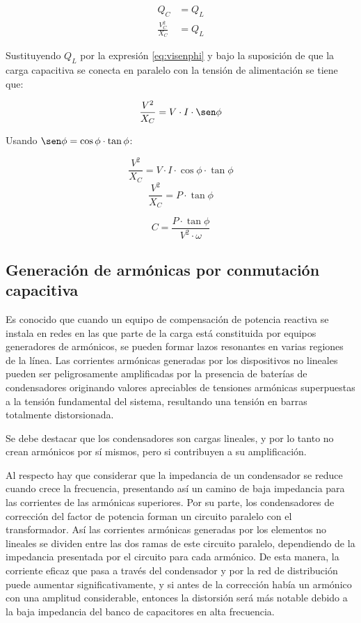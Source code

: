 \begin{align*}
	Q_C &= Q_L \\
	\frac{V_C^2}{X_C} &= Q_L
\end{align*}

Sustituyendo $Q_L$ por la expresión \ref{eq:visenphi} y bajo
la suposición de que la carga capacitiva se conecta en paralelo con la tensión de alimentación se tiene que:

\begin{equation*}
	 \frac{V^2}{X_C} = V\cdot I \cdot \sen\phi
\end{equation*}

Usando $\sen\phi = \cos\phi\cdot\tan\phi$:

\begin{equation*}
    	\frac{V^2}{X_C} = V\cdot I \cdot \cos\phi\cdot\tan\phi
\end{equation*}
\begin{equation*}
     \frac{V^2}{X_C} = P \cdot\tan\phi
\end{equation*}

\begin{equation}
    C = \frac{P \cdot\tan\phi}{V^2\cdot \omega} 
\end{equation}


\subsection{Generación de armónicas por conmutación capacitiva}

Es conocido que cuando un equipo de compensación de potencia reactiva se instala en redes en las que parte de la carga está constituida por equipos generadores de armónicos, se pueden formar lazos resonantes en varias regiones de la línea. Las corrientes armónicas generadas por los dispositivos no lineales pueden ser peligrosamente amplificadas por la presencia de baterías de condensadores originando valores apreciables de tensiones armónicas superpuestas a la tensión fundamental del sistema, resultando una tensión en barras totalmente distorsionada.

Se debe destacar que los condensadores son cargas lineales, y por lo tanto no crean armónicos por sí mismos, pero si contribuyen a su amplificación.

Al respecto hay que considerar que la impedancia de un condensador se reduce cuando crece la frecuencia, presentando así un camino de baja impedancia para las corrientes de las armónicas superiores. Por su parte, los condensadores de corrección del factor de potencia forman un circuito paralelo con el transformador. Así las corrientes armónicas generadas por los elementos no lineales se dividen entre las dos ramas de este circuito paralelo, dependiendo de la impedancia presentada por el circuito para cada armónico. De esta manera, la corriente eficaz que pasa a través del condensador y por la red de distribución puede aumentar significativamente, y si antes de la corrección había un armónico con una amplitud considerable, entonces la distorsión será más notable debido a la baja impedancia del banco de capacitores en alta frecuencia.

